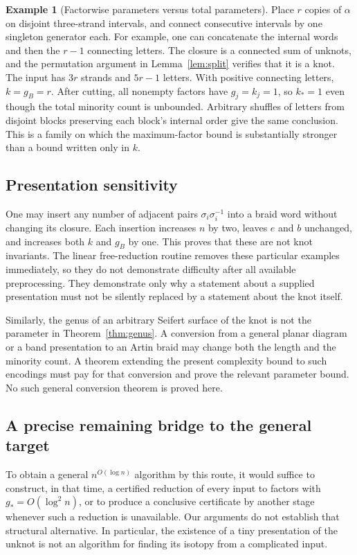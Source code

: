 \documentclass[11pt,letterpaper]{article}
\theoremstyle{definition}
\newtheorem{example}[theorem]{Example}
\begin{document}
\begin{example}[Factorwise parameters versus total parameters]
Place $r$ copies of $\alpha$ on disjoint three-strand intervals, and connect consecutive intervals by one singleton generator each. For example, one can concatenate the internal words and then the $r-1$ connecting letters. The closure is a connected sum of unknots, and the permutation argument in Lemma~\ref{lem:split} verifies that it is a knot. The input has $3r$ strands and $5r-1$ letters. With positive connecting letters, $k=g_B=r$. After cutting, all nonempty factors have $g_j=k_j=1$, so $k_*=1$ even though the total minority count is unbounded. Arbitrary shuffles of letters from disjoint blocks preserving each block's internal order give the same conclusion. This is a family on which the maximum-factor bound is substantially stronger than a bound written only in $k$.
\end{example}

\subsection{Presentation sensitivity}
One may insert any number of adjacent pairs $\sigma_i\sigma_i^{-1}$ into a braid word without changing its closure. Each insertion increases $n$ by two, leaves $e$ and $b$ unchanged, and increases both $k$ and $g_B$ by one. This proves that these are not knot invariants. The linear free-reduction routine removes these particular examples immediately, so they do not demonstrate difficulty after all available preprocessing. They demonstrate only why a statement about a supplied presentation must not be silently replaced by a statement about the knot itself.

Similarly, the genus of an arbitrary Seifert surface of the knot is not the parameter in Theorem~\ref{thm:genus}. A conversion from a general planar diagram or a band presentation to an Artin braid may change both the length and the minority count. A theorem extending the present complexity bound to such encodings must pay for that conversion and prove the relevant parameter bound. No such general conversion theorem is proved here.

\subsection{A precise remaining bridge to the general target}
To obtain a general $n^{O(\log n)}$ algorithm by this route, it would suffice to construct, in that time, a certified reduction of every input to factors with $g_*=O(\log^2 n)$, or to produce a conclusive certificate by another stage whenever such a reduction is unavailable. Our arguments do not establish that structural alternative. In particular, the existence of a tiny presentation of the unknot is not an algorithm for finding its isotopy from a complicated input.
\end{document}
